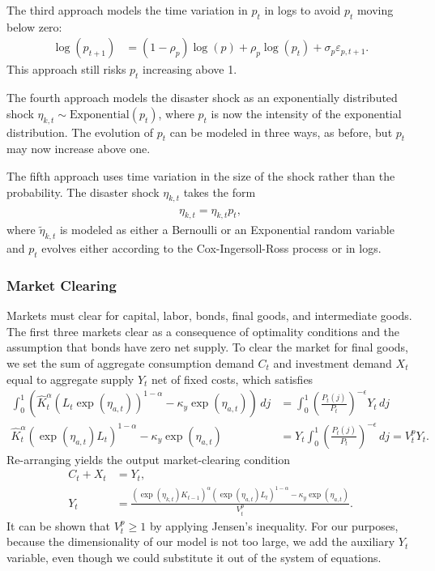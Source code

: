 \documentclass[12 pt, oneside]{article}
\theoremstyle{definition}
\theoremstyle{definition}
\theoremstyle{definition}
\begin{document}
The third approach models the time variation in $p_t$ in logs to avoid $p_t$ moving below zero:
\begin{align}
  \log(p_{t + 1}) & = (1 - \rho_p) \log(p) + \rho_p \log(p_t) + \sigma_p \varepsilon_{p, t + 1}.
\end{align}
This approach still risks $p_t$ increasing above 1.

The fourth approach models the disaster shock as an exponentially distributed shock $\eta_{k, t} \sim \text{Exponential}(p_t)$, where $p_t$ is now the intensity of the exponential distribution. The evolution of $p_t$ can be modeled in three ways, as before, but $p_t$ may now increase above one.

The fifth approach uses time variation in the size of the shock rather than the probability. The disaster shock $\eta_{k, t}$ takes the form
\begin{align}
  \eta_{k, t} = \hat{\eta}_{k, t} p_t,
\end{align}
where $\tilde{\eta}_{k, t}$ is modeled as either a Bernoulli or an Exponential random variable and $p_t$ evolves either according to the Cox-Ingersoll-Ross process or in logs.

\subsubsection{Market Clearing}
Markets must clear for capital, labor, bonds, final goods, and intermediate goods. The first three markets clear as a consequence of optimality conditions and the assumption that bonds have zero net supply. To clear the market for final goods, we set the sum of aggregate consumption demand $C_t$ and investment demand $X_t$ equal to aggregate supply $Y_t$ net of fixed costs, which satisfies
\begin{align*}
\int_0^1( \hat{K}_t^\alpha (L_t\exp(\eta_{a, t}))^{1 - \alpha} - \kappa_y \exp(\eta_{a, t}))\, dj & = \int_0^1\left(\frac{P_t(j)}{P_t}\right)^{-\epsilon} Y_t\, dj\\
  \hat{K}_t^\alpha (\exp(\eta_{a, t})L_t)^{1 - \alpha} - \kappa_y\exp(\eta_{a, t}) & = Y_t \int_0^1\left(\frac{P_t(j)}{P_t}\right)^{-\epsilon} \, dj = V_t^p Y_t.
\end{align*}
Re-arranging yields the output market-clearing condition
\begin{align}\label{eq:output market clearing}
  C_t + X_t & = Y_t,\\
  \label{eq:aggregate supply}
  Y_t & = \frac{(\exp(\eta_{k, t}) K_{t - 1})^{\alpha}(\exp(\eta_{a, t})L_t)^{1 - \alpha} - \kappa_y \exp(\eta_{a, t})}{V_t^p}.
\end{align}
It can be shown that $V_t^p \geq 1$ by applying Jensen's inequality. For our purposes, because the dimensionality of our model is not too large, we add the auxiliary $Y_t$ variable, even though we could substitute it out of the system of equations.
\end{document}
